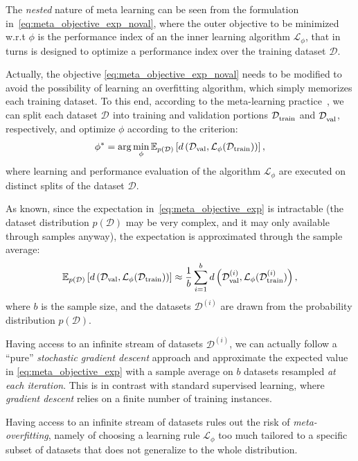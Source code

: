 \documentclass{article}
\newcommand{\diss}{d}
\newcommand{\learn}{\mathcal{L}}
\newcommand{\D}{\mathcal{D}}
\newcommand{\E}{\mathbb{E}}
\begin{document}
The \emph{nested} nature of meta learning can be seen from the formulation in~\eqref{eq:meta_objective_exp_noval}, where the outer objective
to be minimized w.r.t $\phi$ is the performance index of an the inner learning algorithm $\learn_\phi$, that in turns is designed to optimize a performance index over the training dataset $\D$. 

Actually, the objective \eqref{eq:meta_objective_exp_noval}
needs to be modified to avoid the possibility of learning 
an overfitting algorithm, which 
simply memorizes each training dataset.
To this end, according to the meta-learning practice~\cite{hospedales2021meta},  we can split each dataset $\D^{}$ into training and validation 
portions $\D^{}_{\rm train}$ and $\D^{}_{\rm val}$, respectively, and optimize $\phi$ according to the 
criterion:
\begin{equation}
	\label{eq:meta_objective_exp}
    \phi^{*} = \arg \min_\phi 
  \E_{p(\D)} \left [ \diss\left (\D_{\rm val}, \learn_\phi(\D_{\rm train})\right ) \right],
\end{equation}
where learning and performance evaluation of the algorithm $\learn_\phi$ are executed on distinct splits of the dataset $\D$.
 



As known,  since the expectation in~\eqref{eq:meta_objective_exp} is intractable (the dataset distribution $p(\D)$ may be very complex, and it may only available through samples anyway), the  expectation is approximated
through the sample average:
\begin{equation}
	\label{eq:meta_objective_mc}
  \E_{p(\D)} \left [ \diss\left (\D_{\rm val}, \learn_\phi(\D_{\rm train})\right ) \right]  \approx  \frac{1}{b} \sum_{i=1}^b 
 \diss\left (\D^{(i)}_{\rm val}, \learn_\phi(\D^{(i)}_{\rm train})\right ), 
\end{equation}
where $b$ is the sample  size, and  the datasets  $\D^{(i)}$ are drawn from the probability distribution $p(\D)$. 



Having access to an infinite stream of datasets $\D^{(i)}$, we can actually follow a ``pure'' \emph{stochastic gradient descent} approach and approximate the expected value in \eqref{eq:meta_objective_exp} with a sample average on $b$ datasets resampled \emph{at each iteration}. This is in contrast with standard supervised learning, where \emph{gradient descent} relies on a finite number of training instances. 

Having access to an infinite stream of datasets rules out the risk of \emph{meta-overfitting}, namely of choosing a learning rule $\learn_\phi$ too much tailored to a specific 
subset of datasets that does not generalize to the whole distribution.
 
\end{document}
